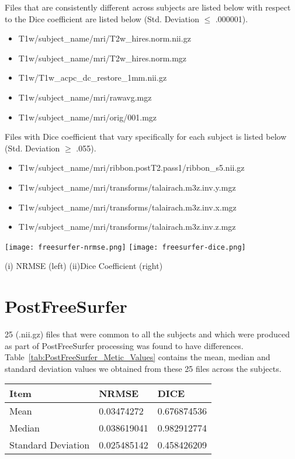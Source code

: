 Files that are consistently different across subjects are listed below with respect to the Dice coefficient are listed below (Std. Deviation $\leq$ .000001).
\begin{itemize}
  \item T1w/subject\_name/mri/T2w\_hires.norm.nii.gz
  \item T1w/subject\_name/mri/T2w\_hires.norm.mgz
  \item T1w/T1w\_acpc\_dc\_restore\_1mm.nii.gz
  \item T1w/subject\_name/mri/rawavg.mgz
  \item T1w/subject\_name/mri/orig/001.mgz
\end{itemize}

Files with Dice coefficient that vary specifically for each subject is listed below (Std. Deviation $\geq$ .055).
\begin{itemize}
\item T1w/subject\_name/mri/ribbon.postT2.pass1/ribbon\_s5.nii.gz
\item T1w/subject\_name/mri/transforms/talairach.m3z.inv.y.mgz
\item T1w/subject\_name/mri/transforms/talairach.m3z.inv.x.mgz
\item T1w/subject\_name/mri/transforms/talairach.m3z.inv.z.mgz
\end{itemize}
\hfill \break
\begin{center}
\texttt{[image: freesurfer-nrmse.png]}%
\texttt{[image: freesurfer-dice.png]}
\caption*{(i) NRMSE (left) (ii)Dice Coefficient (right)}
\label{fig:freesurfer_metric_values}
\end{center}

\section{PostFreeSurfer}\label{sec:Postfreesurfer}
25 (.nii.gz) files that were common to all the subjects and which were produced as part of PostFreeSurfer processing was found to have differences. Table~\ref{tab:PostFreeSurfer_Metic_Values} contains the mean, median and standard deviation values we obtained from these 25 files across the subjects. 
\hfill \break
\begin{center}
\begin{tabular}{|l|l|l|}
\hline
Item               & NRMSE       & DICE        \\ \hline
Mean               & 0.03474272  & 0.676874536 \\ \hline
Median             & 0.038619041 & 0.982912774 \\ \hline
Standard Deviation & 0.025485142 & 0.458426209 \\ \hline
\end{tabular}
\label{tab:PostFreeSurfer_Metic_Values}
\end{center}
\hfill \break

